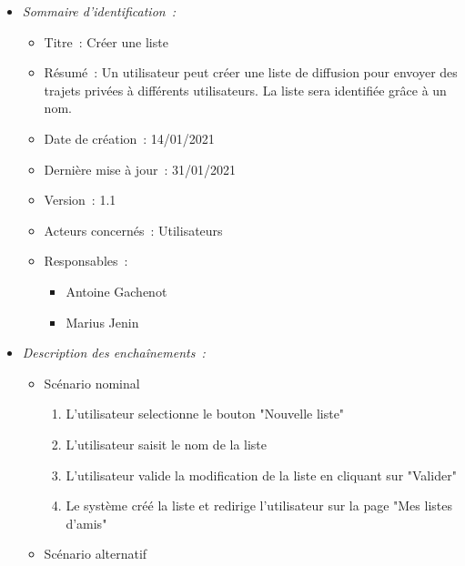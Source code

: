 \begin{itemize}

\item \textit{Sommaire d'identification~:}

    \begin{itemize}
    
    \item Titre~: Créer une liste
    
    \item Résumé~: Un utilisateur peut créer une liste de diffusion pour envoyer des trajets privées à différents utilisateurs. La liste sera identifiée grâce à un nom. 
    
    \item Date de création~: 14/01/2021
    
    \item Dernière mise à jour~: 31/01/2021
    
    \item Version~: 1.1
    
    \item Acteurs concernés~: Utilisateurs
    
    \item Responsables~:
    \begin{itemize}
        \item Antoine Gachenot
        \item Marius Jenin
    \end{itemize}
    
    \end{itemize}

\item \textit{Description des enchaînements~:}
\begin{itemize}
\item Scénario nominal
\begin{enumerate}
       \item L'utilisateur selectionne le bouton "Nouvelle liste"
       \item L'utilisateur saisit le nom de la liste
       \item L'utilisateur valide la modification de la liste en cliquant sur "Valider"
       \item Le système créé la liste et redirige l'utilisateur sur la page "Mes listes d'amis"
       
    \end{enumerate}
    \item Scénario alternatif
    

\end{itemize}
\end{itemize}
